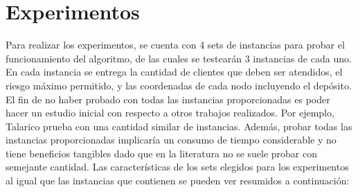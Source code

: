 \documentclass{article}
\begin{document}
\section{Experimentos}
Para realizar los experimentos, se cuenta con 4 sets de instancias para probar el funcionamiento del algoritmo, de las cuales se testearán 3 instancias de cada uno. En cada instancia se entrega la cantidad de clientes que deben ser atendidos, el riesgo máximo permitido, y las coordenadas de cada nodo incluyendo el depósito. El fin de no haber probado con todas las instancias proporcionadas es poder hacer un estudio inicial con respecto a otros trabajos realizados. Por ejemplo, Talarico \cite{talarico2015metaheuristics} prueba con una cantidad similar de instancias. Además, probar todas las instancias proporcionadas implicaría un consumo de tiempo considerable y no tiene beneficios tangibles dado que en la literatura no se suele probar con semejante cantidad. Las características de los sets elegidos para los experimentos al igual que las instancias que contienen se pueden ver resumidos a continuación:
\end{document}
